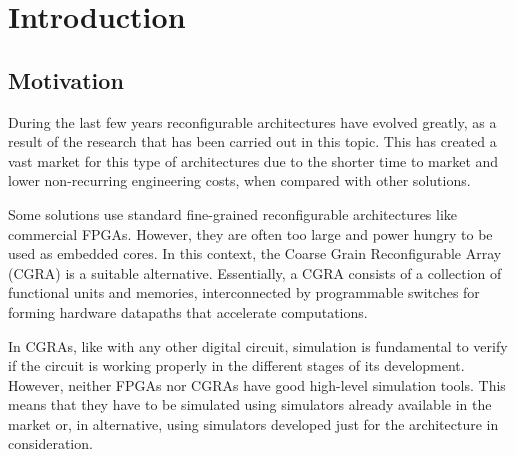 
\chapter{Introduction}
\label{chapter:introduction}


\section{Motivation}
\label{section:motivation}

During the last few years reconfigurable architectures have evolved greatly, as
a result of the research that has been carried out in this topic. This has
created a vast market for this type of architectures due to the shorter time to
market and lower non-recurring engineering costs, when compared with other
solutions.

Some solutions use standard fine-grained reconfigurable architectures like
commercial FPGAs. However, they are often too large and power hungry to be used
as embedded cores. In this context, the Coarse Grain Reconfigurable Array (CGRA)
is a suitable alternative. Essentially, a CGRA consists of a collection of
functional units and memories, interconnected by programmable switches for
forming hardware datapaths that accelerate computations.

In CGRAs, like with any other digital circuit, simulation is fundamental to
verify if the circuit is working properly in the different stages of its
development. However, neither FPGAs nor CGRAs have good high-level simulation
tools. This means that they have to be simulated using simulators already
available in the market or, in alternative, using simulators developed just for
the architecture in consideration.


